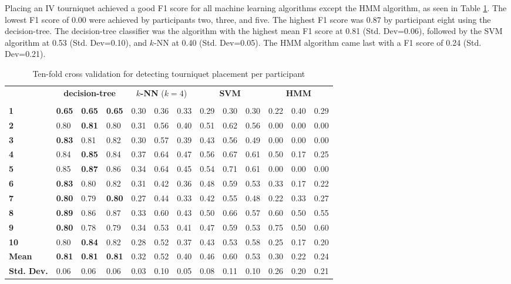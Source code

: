 \par Placing an IV tourniquet achieved a good F1 score for all machine learning algorithms except the HMM algorithm, as seen in Table \ref{tab:t:ml}. The lowest F1 score of 0.00 were achieved by participants two, three, and five. The highest F1 score was 0.87 by participant eight using the decision-tree. The decision-tree classifier was the algorithm with the highest mean F1 score at 0.81 (Std. Dev=0.06), followed by the SVM algorithm at 0.53 (Std. Dev=0.10), and $k$-NN at 0.40 (Std. Dev=0.05). The HMM algorithm came last with a F1 score of 0.24 (Std. Dev=0.21).
\begin{table}[h]
	\centering
	\begin{tabular}{lllllllllllll}
		\multirow{2}{*}{\rotatebox[origin=c]{45}{\textbf{Participant}}} & \multicolumn{3}{c}{\textbf{decision-tree}} & \multicolumn{3}{c}{\textbf{$k$-NN} ($k=4$)} & \multicolumn{3}{c}{\textbf{SVM}} & \multicolumn{3}{c}{\textbf{HMM}} \\
		& \rot{Precision}     & \rot{Recall}    & \rot{F1}    & \rot{Precision}     & \rot{Recall}    & \rot{F1}  & \rot{Precision}     & \rot{Recall}    & \rot{F1} & \rot{Precision}     & \rot{Recall}    & \rot{F1} \\
		\textbf{1}   & \textbf{0.65} & \textbf{0.65} & \textbf{0.65} & 0.30 & 0.36 & 0.33 & 0.29 & 0.30 & 0.30 & 0.22 & 0.40 & 0.29 \\
		\textbf{2}   & 0.80 & \textbf{0.81} & 0.80 & 0.31 & 0.56 & 0.40 & 0.51 & 0.62 & 0.56 & 0.00 & 0.00 & 0.00 \\
		\textbf{3}   & \textbf{0.83} & 0.81 & 0.82 & 0.30 & 0.57 & 0.39 & 0.43 & 0.56 & 0.49 & 0.00 & 0.00 & 0.00 \\
		\textbf{4}   & 0.84 & \textbf{0.85} & 0.84 & 0.37 & 0.64 & 0.47 & 0.56 & 0.67 & 0.61 & 0.50 & 0.17 & 0.25 \\
		\textbf{5}   & 0.85 & \textbf{0.87} & 0.86 & 0.34 & 0.64 & 0.45 & 0.54 & 0.71 & 0.61 & 0.00 & 0.00 & 0.00 \\
		\textbf{6}   & \textbf{0.83} & 0.80 & 0.82 & 0.31 & 0.42 & 0.36 & 0.48 & 0.59 & 0.53 & 0.33 & 0.17 & 0.22 \\
		\textbf{7}   & \textbf{0.80} & 0.79 & \textbf{0.80} & 0.27 & 0.44 & 0.33 & 0.42 & 0.55 & 0.48 & 0.22 & 0.33 & 0.27 \\
		\textbf{8}   & \textbf{0.89} & 0.86 & 0.87 & 0.33 & 0.60 & 0.43 & 0.50 & 0.66 & 0.57 & 0.60 & 0.50 & 0.55 \\
		\textbf{9}   & \textbf{0.80} & 0.78 & 0.79 & 0.34 & 0.53 & 0.41 & 0.47 & 0.59 & 0.53 & 0.75 & 0.50 & 0.60 \\
		\textbf{10} & 0.80 & \textbf{0.84} & 0.82 & 0.28 & 0.52 & 0.37 & 0.43 & 0.53 & 0.58 & 0.25 & 0.17 & 0.20 \\
		\hline
		\textbf{Mean} & \textbf{0.81} & \textbf{0.81} & \textbf{0.81} & 0.32 & 0.52 & 0.40 & 0.46 & 0.60 & 0.53 & 0.30 & 0.22 & 0.24 \\
		\textbf{Std. Dev.} & 0.06 & 0.06 & 0.06 & 0.03 & 0.10 & 0.05 & 0.08 & 0.11 & 0.10 & 0.26 & 0.20 & 0.21
	\end{tabular}
	\caption{Ten-fold cross validation for detecting tourniquet placement per participant}
	\label{tab:t:ml}
\end{table}

